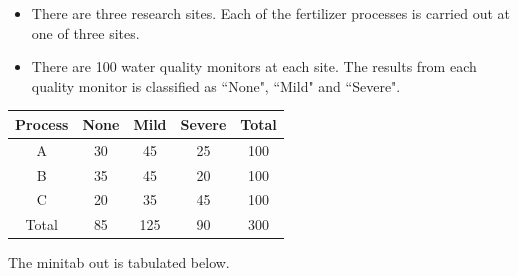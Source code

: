 \documentclass[a4paper,12pt]{article}
\begin{document}
\begin{itemize}
	\item There are three research sites. Each of the fertilizer processes is carried out at one of three sites. 
	
	\item There are 100 water quality monitors at each site. The results from each quality monitor is classified as ``None", ``Mild" and ``Severe".
\end{itemize}



\begin{center}
	\begin{tabular}{|c||c|c|c||c|}	
		\hline
		Process &	None	&	Mild	&	Severe	&	Total	\\ \hline
		A	&	30	&	45	&	25	&	100	\\ \hline
		B	&	35	&	45	&	20	&	100	\\ \hline
		C	&	20	&	35	&	45	&	100	\\ \hline
		Total    &	85	&	125	&	90	&	300	\\ \hline
		
	\end{tabular}
\end{center}

The minitab out is tabulated below.
\medskip


%
%
%		
\end{document}

